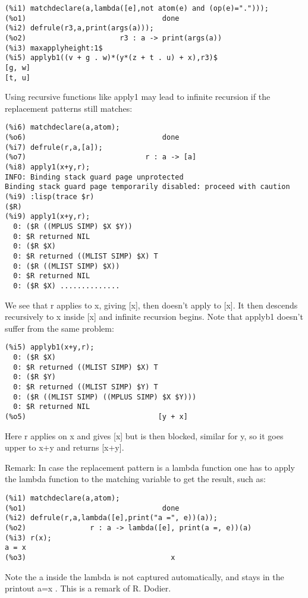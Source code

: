 \documentclass[a4paper,11pt]{article}
\begin{document}
\begin{verbatim}
(%i1) matchdeclare(a,lambda([e],not atom(e) and (op(e)=".")));
(%o1)                                done
(%i2) defrule(r3,a,print(args(a)));
(%o2)                      r3 : a -> print(args(a))
(%i3) maxapplyheight:1$
(%i5) applyb1((v + g . w)*(y*(z + t . u) + x),r3)$
[g, w] 
[t, u] 
\end{verbatim}
Using recursive functions like apply1 may lead to infinite recursion
if the replacement patterns still matches:
\begin{verbatim}
(%i6) matchdeclare(a,atom);
(%o6)                                done
(%i7) defrule(r,a,[a]);
(%o7)                            r : a -> [a]
(%i8) apply1(x+y,r);
INFO: Binding stack guard page unprotected
Binding stack guard page temporarily disabled: proceed with caution
(%i9) :lisp(trace $r)
($R)
(%i9) apply1(x+y,r);
  0: ($R ((MPLUS SIMP) $X $Y))
  0: $R returned NIL
  0: ($R $X)
  0: $R returned ((MLIST SIMP) $X) T
  0: ($R ((MLIST SIMP) $X))
  0: $R returned NIL
  0: ($R $X) ..............
\end{verbatim}
We see that r applies to x, giving [x], then doesn't apply to [x]. It then
descends recursively to x inside [x] and infinite recursion begins. Note
that applyb1 doesn't suffer from the same problem:

\begin{verbatim}
(%i5) applyb1(x+y,r);
  0: ($R $X)
  0: $R returned ((MLIST SIMP) $X) T
  0: ($R $Y)
  0: $R returned ((MLIST SIMP) $Y) T
  0: ($R ((MLIST SIMP) ((MPLUS SIMP) $X $Y)))
  0: $R returned NIL
(%o5)                               [y + x]
\end{verbatim}

Here r applies on x and gives [x] but is then blocked, similar for y, so it goes
upper to x+y and returns [x+y].


Remark: In case the replacement pattern is a lambda function one has to apply the
lambda function to the matching variable to get the result, such as:
\begin{verbatim}
(%i1) matchdeclare(a,atom);
(%o1)                                done
(%i2) defrule(r,a,lambda([e],print("a =", e))(a));
(%o2)               r : a -> lambda([e], print(a =, e))(a)
(%i3) r(x);
a = x 
(%o3)                                  x
\end{verbatim}
Note the a inside the lambda is not captured automatically, and stays in the
printout a=x . This is a remark of R. Dodier.
\end{document}
